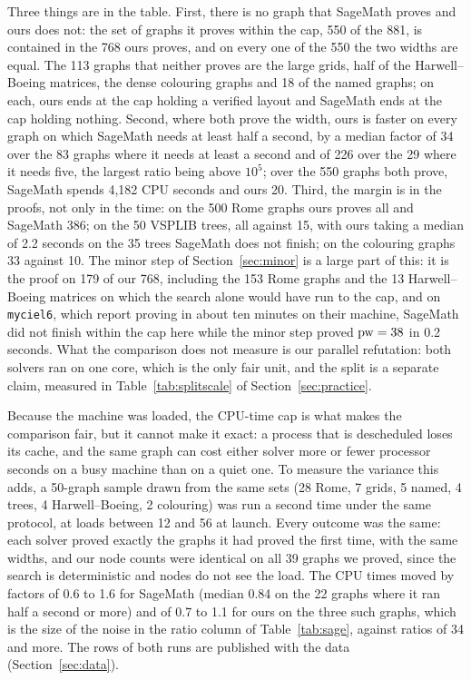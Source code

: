 Three things are in the table. First, there is no graph that SageMath proves
and ours does not: the set of graphs it proves within the cap, 550 of the 881,
is contained in the 768 ours proves, and on every one of the 550 the two
widths are equal. The 113 graphs that neither proves are the large grids, half
of the Harwell--Boeing matrices, the dense colouring graphs and 18 of the named
graphs; on each, ours ends at the cap holding a verified layout and SageMath
ends at the cap holding nothing. Second, where both prove the width, ours is
faster on every graph on which SageMath needs at least half a second, by a
median factor of 34 over the 83 graphs where it needs at least a second and of
226 over the 29 where it needs five, the largest ratio being above $10^5$;
over the 550 graphs both prove, SageMath spends 4,182 CPU seconds and ours 20.
Third, the margin is in the proofs, not only in the time: on the 500 Rome
graphs ours proves all and SageMath 386; on the 50 VSPLIB trees, all against
15, with ours taking a median of 2.2 seconds on the 35 trees SageMath does not
finish; on the colouring graphs 33 against 10. The minor step of
Section~\ref{sec:minor} is a large part of this: it is the proof on 179 of our
768, including the 153 Rome graphs and the 13 Harwell--Boeing matrices on
which the search alone would have run to the cap, and on \texttt{myciel6},
which \citet{CoudertMazauricNisse2016} report proving in about ten minutes on
their machine, SageMath did not finish within the cap here while the minor
step proved $\mathrm{pw}=38$ in 0.2 seconds. What the comparison does not measure is
our parallel refutation: both solvers ran on one core, which is the only fair
unit, and the split is a separate claim, measured in Table~\ref{tab:splitscale}
of Section~\ref{sec:practice}.

Because the machine was loaded, the CPU-time cap is what makes the comparison
fair, but it cannot make it exact: a process that is descheduled loses its
cache, and the same graph can cost either solver more or fewer processor
seconds on a busy machine than on a quiet one. To measure the variance this
adds, a 50-graph sample drawn from the same sets (28 Rome, 7 grids, 5 named, 4
trees, 4 Harwell--Boeing, 2 colouring) was run a second time under the same
protocol, at loads between 12 and 56 at launch. Every outcome was the same:
each solver proved exactly the graphs it had proved the first time, with the
same widths, and our node counts were identical on all 39 graphs we proved,
since the search is deterministic and nodes do not see the load. The CPU
times moved by factors of 0.6 to 1.6 for SageMath (median 0.84 on the 22
graphs where it ran half a second or more) and of 0.7 to 1.1 for ours on the
three such graphs, which is the size of the noise in the ratio column of
Table~\ref{tab:sage}, against ratios of 34 and more. The rows of both runs
are published with the data (Section~\ref{sec:data}).

